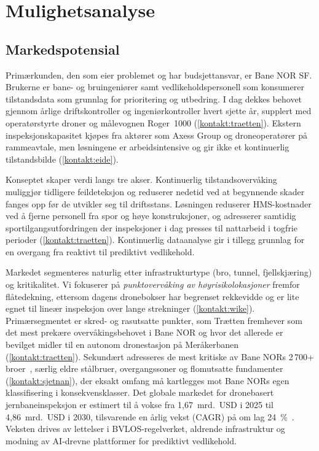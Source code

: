\section{Mulighetsanalyse}

\subsection{Markedspotensial}

Primærkunden, den som eier problemet og har budsjettansvar, er Bane NOR SF. Brukerne er bane- og bruingeniører samt vedlikeholdspersonell som konsumerer tilstandsdata som grunnlag for prioritering og utbedring. I dag dekkes behovet gjennom årlige driftskontroller og ingeniørkontroller hvert sjette år, supplert med operatørstyrte droner og målevognen Roger~1000 (\cref{kontakt:traetten}). Ekstern inspeksjonskapasitet kjøpes fra aktører som Axess Group og droneoperatører på rammeavtale, men løsningene er arbeidsintensive og gir ikke et kontinuerlig tilstandsbilde (\cref{kontakt:eide}).

Konseptet skaper verdi langs tre akser. Kontinuerlig tilstandsovervåking muliggjør tidligere feildeteksjon og reduserer nedetid ved at begynnende skader fanges opp før de utvikler seg til driftsstans. Løsningen reduserer HMS-kostnader ved å fjerne personell fra spor og høye konstruksjoner, og adresserer samtidig sportilgangsutfordringen der inspeksjoner i dag presses til nattarbeid i togfrie perioder (\cref{kontakt:traetten}). Kontinuerlig dataanalyse gir i tillegg grunnlag for en overgang fra reaktivt til prediktivt vedlikehold.

Markedet segmenteres naturlig etter infrastrukturtype (bro, tunnel, fjellskjæring) og kritikalitet. Vi fokuserer på \emph{punktovervåking av høyrisikolokasjoner} fremfor flåtedekning, ettersom dagens dronebokser har begrenset rekkevidde og er lite egnet til lineær inspeksjon over lange strekninger (\cref{kontakt:wike}). Primærsegmentet er skred- og rasutsatte punkter, som Trætten fremhever som det mest prekære overvåkingsbehovet i Bane NOR og hvor det allerede er bevilget midler til en autonom dronestasjon på Meråkerbanen (\cref{kontakt:traetten}). Sekundært adresseres de mest kritiske av Bane NORs 2\,700+ broer~\cite{jernbanedirektoratet_tall}, særlig eldre stålbruer, overgangssoner og flomutsatte fundamenter (\cref{kontakt:sjetnan}), der eksakt omfang må kartlegges mot Bane NORs egen klassifisering i konsekvensklasser. Det globale markedet for dronebasert jernbaneinspeksjon er estimert til å vokse fra 1,67~mrd.~USD i 2025 til 4,86~mrd.~USD i 2030, tilsvarende en årlig vekst (CAGR) på om lag 24~\%~\cite{businessresearch_drone_2025}. Veksten drives av lettelser i BVLOS-regelverket, aldrende infrastruktur og modning av AI-drevne plattformer for prediktivt vedlikehold.

